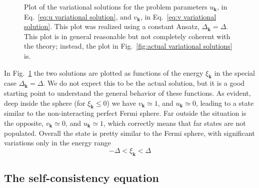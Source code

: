 \begin{figure}
	\centering
	
	\caption{Plot of the variational solutions for the problem parameters $u_\mathbf{k}$, in Eq.~\eqref{eq:u variational solution}, and $v_\mathbf{k}$, in Eq.~\eqref{eq:v variational solution}. This plot was realized using a constant Ansatz, $\Delta_\mathbf{k} = \Delta$. This plot is in general reasonable but not completely coherent with the theory; instead, the plot in Fig.~\ref{fig:actual variational solutions} is.}
	\label{fig:variational solutions}
\end{figure}

In Fig.~\ref{fig:variational solutions} the two solutions are plotted as functions of the energy $\xi_\mathbf{k}$ in the special case $\Delta_\mathbf{k} = \Delta$. We do not expect this to be the actual solution, but it is a good starting point to understand the general behavior of these functions. As evident, deep inside the sphere (for $\xi_\mathbf{k}\le0$) we have $v_\mathbf{k} \simeq 1$, and $u_\mathbf{k} \simeq 0$, leading to a state similar to the non-interacting perfect Fermi sphere. Far outside the situation is the opposite, $v_\mathbf{k} \simeq 0$, and $u_\mathbf{k} \simeq 1$, which correctly means that far states are not populated. Overall the state is pretty similar to the Fermi sphere, with significant variations only in the energy range
\[
	- \Delta < \xi_\mathbf{k} < \Delta
\]

\subsection{The self-consistency equation}\label{subsec:the self consistency equation}

